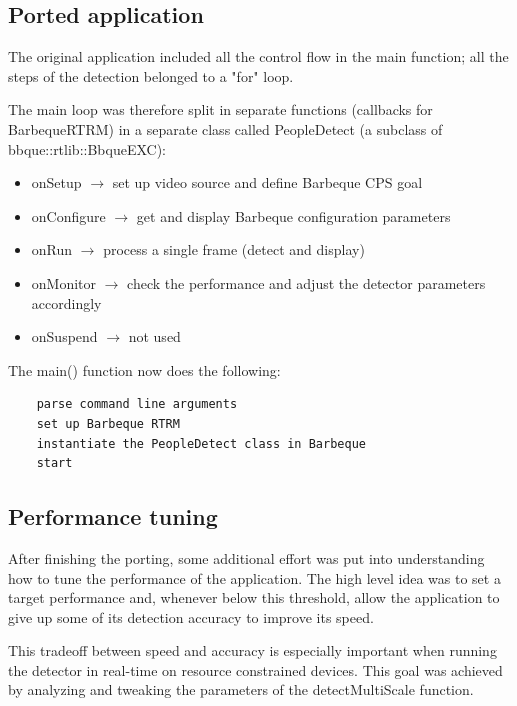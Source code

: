 \subsection{Ported application}
The original application included all the control flow in the
main function; all the steps of the detection belonged to a "for" loop.

The main loop was therefore split in separate functions
(callbacks for BarbequeRTRM) in a separate class called
PeopleDetect (a subclass of bbque::rtlib::BbqueEXC):
\begin{itemize}
\item onSetup $\rightarrow$ set up video source and define Barbeque CPS goal
\item onConfigure $\rightarrow$ get and display Barbeque configuration parameters
\item onRun $\rightarrow$ process a single frame (detect and display)
\item onMonitor $\rightarrow$ check the performance and adjust the detector parameters accordingly
\item onSuspend $\rightarrow$ not used
\end{itemize}

The main() function now does the following:
\begin{verbatim}
    parse command line arguments
    set up Barbeque RTRM
    instantiate the PeopleDetect class in Barbeque
    start
\end{verbatim}

\subsection{Performance tuning}
After finishing the porting, some additional effort was put into
understanding how to tune the performance of the application.
The high level idea was to set a target performance and, whenever
below this threshold, allow the application to give up some of its
detection accuracy to improve its speed.

This tradeoff between speed and accuracy is especially important
when running the detector in real-time on resource constrained
devices. 
This goal was achieved by analyzing and tweaking the parameters of
the detectMultiScale function.

